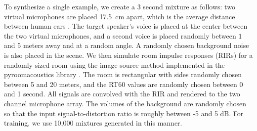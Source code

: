\documentclass [11pt, proquest] {uwthesis}[2020/02/24]
\begin{document}
To synthesize a single example, we create a 3 second mixture as follows: two virtual microphones are placed 17.5~cm apart, which is the average distance between human ears \cite{RISOUD2018259}. The target speaker's voice is placed  at the center between the two virtual microphones, and a second voice is placed randomly between $1$ and $5$ meters away and at a random angle. A randomly chosen background noise is also placed in the scene. We then simulate room impulse responses (RIRs) for a randomly sized room using the image source method implemented in the pyroomacoustics library \cite{allen1979image, scheibler2018pyroomacoustics}. The room is rectangular with sides randomly chosen between 5 and 20 meters, and the RT60 values are randomly chosen between 0 and 1 second. All signals are convolved with the RIR and rendered to the two channel microphone array. The volumes of the background are randomly chosen so that the input signal-to-distortion ratio is roughly between -5 and 5 dB. For training, we use 10,000 mixtures generated in this manner.
\end{document}
